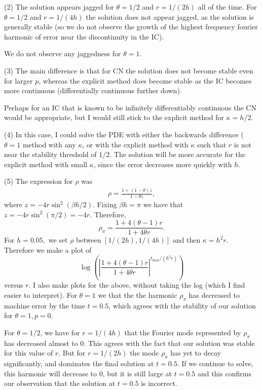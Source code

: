 \documentclass[11pt]{article}
\def\f{\frac }
\begin{document}
\begin{enumerate}
(2) The solution appears jagged for $\theta = 1/2$ and $r = 1/(2h)$ all of the time. For $\theta = 1/2$ and $r = 1/(4h)$ the solution does not appear jagged, as the solution is generally stable (so we do not observe the growth of the highest frequency fourier harmonic of error near the discontinuity in the IC).

We do not observe any jaggedness for $\theta = 1$.

(3) The main difference is that for CN the solution does not become stable even for larger $p$, whereas the explicit method does become stable as the IC becomes more continuous (differentially continuous further down).

Perhaps for an IC that is known to be infinitely differentiably continuous the CN would be appropriate, but I would still stick to the explicit method for $\kappa = h/2$.

(4) In this case, I could solve the PDE with either the backwards difference ($\theta  = 1$ method with any $\kappa$, or with the explicit method with $\kappa$ such that $r$ is not near the stability threshold of $1/2$.
The solution will be more accurate for the explicit method with small $\kappa$, since the error decreases more quickly with $h$.

(5) The expression for $\rho$ was 
\begin{align*} \rho  =  \f{ 1+ (1-\theta) z} {1-\theta z}, \end{align*}
where $z = -4r \sin ^2 \left ( \beta h / 2 \right ) $.
Fixing $\beta h = \pi$ we have that $z = -4r \sin ^2 \left ( \pi / 2 \right )  = -4r $.
Therefore, 
\[ \rho _\pi = \f{1+ 4(\theta-1)r}{1+4\theta r} . \]
For $h = 0.05,$ we set $\rho$ between $[1/(2h),1/(4h)]$ and then $\kappa = h^2 r$.
Therefore we make a plot of
\[ \log \left ( \left | \f{1+ 4(\theta-1)r}{1+4\theta r} \right | ^{t_{\max} / (h^2 r) } \right ) \]
versus $r$.
I also make plots for the above, without taking the log (which I find easier to interpret).
For $\theta = 1$ we that the the harmonic $\rho _\pi$ has decreased to machine error by the time $t = 0.5$, which agrees with the stability of our solution for $\theta =1, p = 0$.

For $\theta = 1/2$, we have for $r = 1/(4h)$ that the Fourier mode represented by $\rho _\pi$ has decreased almost to 0.
This agrees with the fact that our solution was stable for this value of $r$.
But for $r = 1/(2h)$ the mode $\rho _\pi$ has yet to decay significantly, and dominates the final solution at $t = 0.5$.
If we continue to solve, this harmonic will decrease to 0, but it is still large at $t = 0.5$ and this confirms our observation that the solution at $t = 0.5$ is incorrect.


\end{enumerate}
\end{document}
